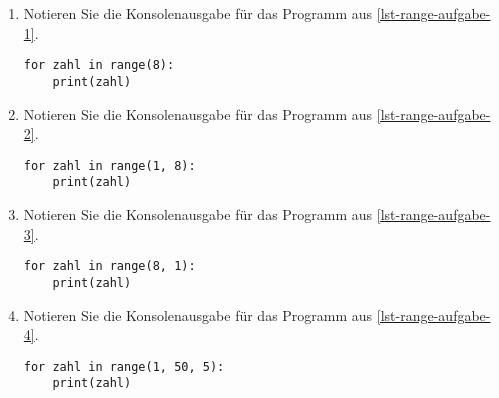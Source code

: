 \begin{enumerate}
\item Notieren Sie die Konsolenausgabe für das Programm aus \autoref{lst-range-aufgabe-1}.

\begin{minipage}[c][1in][c]{0.35\textwidth}
\fillwithgrid{0.9in}
\end{minipage}
\hfill
\begin{minipage}[c][1in][c]{0.6\textwidth}
\begin{lstlisting}[caption={Aufgabe 1}, label={lst-range-aufgabe-1}]
for zahl in range(8):
    print(zahl)
\end{lstlisting}
\end{minipage}

\item Notieren Sie die Konsolenausgabe für das Programm aus \autoref{lst-range-aufgabe-2}.

\begin{minipage}[c][1in][c]{0.35\textwidth}
\fillwithgrid{0.9in}
\end{minipage}
\hfill
\begin{minipage}[c][1in][c]{0.6\textwidth}
\begin{lstlisting}[caption={Aufgabe 2}, label={lst-range-aufgabe-2}]
for zahl in range(1, 8):
    print(zahl)
\end{lstlisting}
\end{minipage}

\item Notieren Sie die Konsolenausgabe für das Programm aus \autoref{lst-range-aufgabe-3}.

\begin{minipage}[c][1in][c]{0.35\textwidth}
\fillwithgrid{0.9in}
\end{minipage}
\hfill
\begin{minipage}[c][1in][c]{0.6\textwidth}
\begin{lstlisting}[caption={Aufgabe 3}, label={lst-range-aufgabe-3}]
for zahl in range(8, 1):
    print(zahl)
\end{lstlisting}
\end{minipage}

\item Notieren Sie die Konsolenausgabe für das Programm aus \autoref{lst-range-aufgabe-4}.

\begin{minipage}[c][1in][c]{0.35\textwidth}
\fillwithgrid{0.9in}
\end{minipage}
\hfill
\begin{minipage}[c][1in][c]{0.6\textwidth}
\begin{lstlisting}[caption={Aufgabe 4}, label={lst-range-aufgabe-4}]
for zahl in range(1, 50, 5):
    print(zahl)
\end{lstlisting}
\end{minipage}


\end{enumerate}
